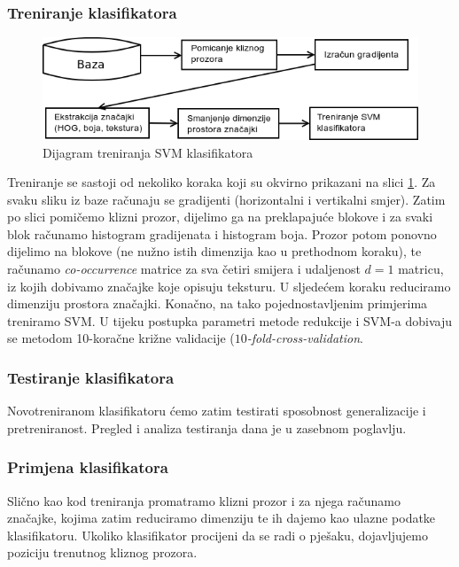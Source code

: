 \documentclass[seminar]{fer}
\begin{document}
\subsubsection{Treniranje klasifikatora}

\begin{figure}[h!]
\center
\includegraphics[scale=0.7]{img/treniranje.png}
\caption{Dijagram treniranja SVM klasifikatora}
\label{treniranje}
\end{figure}

Treniranje se sastoji od nekoliko koraka koji su okvirno prikazani na slici \ref{treniranje}.
Za svaku sliku iz baze računaju se gradijenti (horizontalni i vertikalni smjer). Zatim po slici pomičemo
klizni prozor, dijelimo ga na preklapajuće blokove i za svaki blok računamo histogram gradijenata i histogram boja. Prozor potom ponovno dijelimo
na blokove (ne nužno istih dimenzija kao u prethodnom koraku), te računamo \emph{co-occurrence} matrice za sva četiri smijera i udaljenost $d = 1$ matricu, iz kojih dobivamo značajke koje opisuju
teksturu. U sljedećem koraku reduciramo dimenziju prostora značajki. Konačno, na tako pojednostavljenim primjerima treniramo SVM. U tijeku postupka parametri metode redukcije i SVM-a dobivaju se metodom 10-koračne križne validacije (\emph{$10$-fold-cross-validation}.

\subsubsection{Testiranje klasifikatora}

Novotreniranom klasifikatoru ćemo zatim testirati sposobnost generalizacije i pretreniranost. Pregled i analiza testiranja dana je u zasebnom poglavlju.

\subsubsection{Primjena klasifikatora}

Slično kao kod treniranja promatramo klizni prozor i za njega računamo značajke, kojima zatim reduciramo dimenziju te ih dajemo kao ulazne podatke klasifikatoru. Ukoliko klasifikator procijeni da se radi o pješaku, dojavljujemo poziciju trenutnog kliznog prozora.
\end{document}
